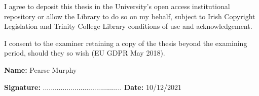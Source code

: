 \begin{declaration}      

%
%
%
I agree to deposit this thesis in the University's open access institutional repository or allow the Library to do so on my behalf, subject to Irish Copyright Legislation and Trinity College Library conditions of use and acknowledgement.

I consent to the examiner retaining a copy of the thesis beyond the examining period, should they so wish (EU GDPR May 2018). 

\vspace{30mm}

\textbf{Name:} Pearse Murphy

\vspace{15mm}

\textbf{Signature:}  ........................................		\textbf{Date:}  10/12/2021

\end{declaration}

\newpage
\thispagestyle{empty}
\mbox{}
